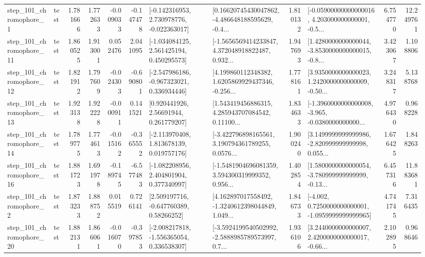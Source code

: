 \begin{tabular}{llrrrrllrlrr}
   step\_101\_chromophore\_1 &      test &      1.781666 &    1.772633 &     -0.009033 & -0.147478 &   [-0.142316953, 2.730978776, -0.022363017] &  [0.16620745430047862, -4.486648188595629, -0.4... &       1.810132 &  [-0.05900000000000016, 4.203000000000001, -0.5... &            6.754770 &         12.249761 \\
  step\_101\_chromophore\_11 &      test &      1.860525 &    1.913001 &      0.052476 &  2.041095 &    [-1.034084125, 2.561425194, 0.450295573] &  [-1.5656569414233847, 4.372048918822487, 0.932... &       1.947693 &  [1.4280000000000044, -3.8530000000000015, -0.8... &            3.423067 &          1.108806 \\
  step\_101\_chromophore\_12 &      test &      1.821912 &    1.797609 &     -0.024303 & -0.690801 &   [-2.547986186, -0.967323021, 0.336934446] &  [4.199860112348382, 1.6205869929437346, -0.256... &       1.778161 &  [3.9350000000000023, 1.2420000000000009, -0.50... &            3.248317 &          5.138768 \\
  step\_101\_chromophore\_13 &      test &      1.923138 &    1.922228 &     -0.000911 &  0.141521 &      [0.920441926, 2.56691944, 0.261779207] &  [1.543419456886315, 4.285943707084542, 0.11100... &       1.834633 &  [-1.3960000000000008, -3.965, -0.0380000000000... &            4.976430 &          0.968228 \\
  step\_101\_chromophore\_14 &      test &      1.789775 &    1.774613 &     -0.015162 & -0.365552 &    [-2.113970408, 1.813678139, 0.019757176] &  [-3.422796898165561, 3.190794361789255, 0.0576... &       1.900240 &  [3.1499999999999986, -2.820999999999998, 0.055... &            1.676425 &          1.848263 \\
  step\_101\_chromophore\_16 &      test &      1.881723 &    1.691978 &     -0.189745 & -6.577483 &    [-1.082208956, 2.404801904, 0.377340997] &  [-1.5481904696081359, 3.594300319999352, 0.956... &       1.402854 &  [1.5800000000000054, -3.780999999999999, -0.13... &            6.457316 &         11.883681 \\
   step\_101\_chromophore\_2 &      test &      1.873233 &    1.888752 &      0.015519 &  0.726141 &     [2.509197716, -0.647760389, 0.58266252] &  [4.162897017558492, -1.3240612398044849, 1.049... &       1.846733 &  [-4.002, 0.7250000000000001, -1.0959999999999965] &            4.741745 &          7.316435 \\
  step\_101\_chromophore\_20 &      test &      1.882131 &    1.866061 &     -0.016070 & -0.397853 &   [-2.008217818, -1.556365054, 0.336538307] &  [-3.5924199540502992, -2.5888985789573997, 0.7... &       1.936106 &  [3.2440000000000007, 2.4200000000000017, -0.66... &            2.102895 &          0.968646 \\

\end{tabular}
